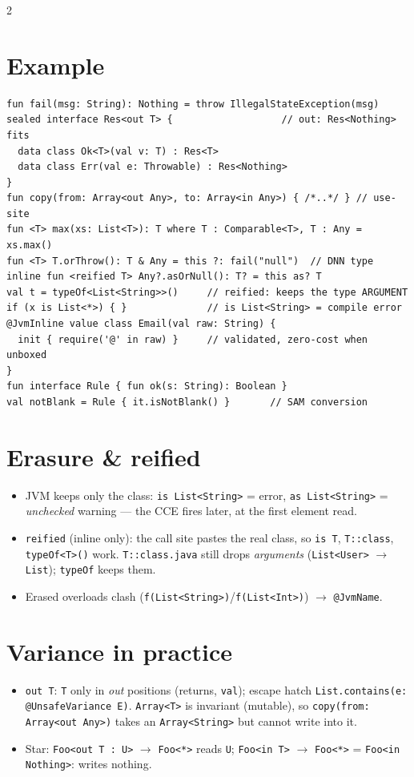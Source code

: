 \documentclass[8pt]{extarticle}
\newcommand\st{\hbox{<}\hbox{*}\hbox{>}}  %
\newcommand\cc{\texttt{\hbox{:}\hbox{:}}}
\begin{document}
\begin{multicols}{2}
\section{Example}
\begin{lstlisting}[language=KotlinSheet]
fun fail(msg: String): Nothing = throw IllegalStateException(msg)
sealed interface Res<out T> {                   // out: Res<Nothing> fits
  data class Ok<T>(val v: T) : Res<T>
  data class Err(val e: Throwable) : Res<Nothing>
}
fun copy(from: Array<out Any>, to: Array<in Any>) { /*..*/ } // use-site
fun <T> max(xs: List<T>): T where T : Comparable<T>, T : Any = xs.max()
fun <T> T.orThrow(): T & Any = this ?: fail("null")  // DNN type
inline fun <reified T> Any?.asOrNull(): T? = this as? T
val t = typeOf<List<String>>()     // reified: keeps the type ARGUMENT
if (x is List<*>) { }              // is List<String> = compile error
@JvmInline value class Email(val raw: String) {
  init { require('@' in raw) }     // validated, zero-cost when unboxed
}
fun interface Rule { fun ok(s: String): Boolean }
val notBlank = Rule { it.isNotBlank() }       // SAM conversion
\end{lstlisting}

\columnbreak

\section{Erasure \& reified}
\begin{itemize}\raggedright
  \item JVM keeps only the class: \texttt{is List<String>} = error, \texttt{as List<String>}
        = \emph{unchecked} warning — the CCE fires later, at the first element read.
  \item \texttt{reified} (inline only): the call site pastes the real class, so \texttt{is T},
        \texttt{T}\cc\texttt{class}, \texttt{typeOf<T>()} work. \texttt{T}\cc\texttt{class.java} still drops
        \emph{arguments} (\texttt{List<User>} $\to$ \texttt{List}); \texttt{typeOf} keeps them.
  \item Erased overloads clash (\texttt{f(List<String>)}/\texttt{f(List<Int>)}) $\to$ \texttt{@JvmName}.
\end{itemize}

\section{Variance in practice}
\begin{itemize}\raggedright
  \item \texttt{out T}: \texttt{T} only in \emph{out} positions (returns, \texttt{val});
        escape hatch \texttt{List.contains(e: @UnsafeVariance E)}. \texttt{Array<T>} is
        invariant (mutable), so \texttt{copy(from: Array<out Any>)} takes an
        \texttt{Array<String>} but cannot write into it.
  \item Star: \texttt{Foo<out T : U>} $\to$ \texttt{Foo\st} reads \texttt{U};
        \texttt{Foo<in T>} $\to$ \texttt{Foo\st} = \texttt{Foo<in Nothing>}: writes nothing.
\end{itemize}


\end{multicols}
\end{document}
